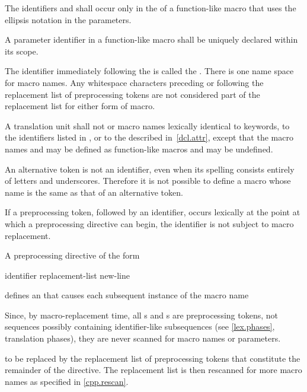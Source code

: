 \pnum
{}%
%
The identifiers  and 
shall occur only in the 
of a function-like macro that uses the ellipsis notation in the parameters.

\pnum
A parameter identifier in a function-like macro
shall be uniquely declared within its scope.

\pnum
The identifier immediately following the
is called the
%
.
There is one name space for macro names.
Any whitespace characters preceding or following the
replacement list of preprocessing tokens are not considered
part of the replacement list for either form of macro.

\pnum
{}%
A translation unit shall not  or 
macro names lexically identical
to keywords,
to the identifiers listed in , or
to the  described in~\ref{dcl.attr},
except that the macro names  and  may be
defined as function-like macros and may be undefined.
\begin{note}
An alternative token is not an identifier,
even when its spelling consists entirely of letters and underscores.
Therefore it is not possible to define a macro
whose name is the same as that of an alternative token.
\end{note}

\pnum
If a
\tcode{\#}
preprocessing token,
followed by an identifier,
occurs lexically
at the point at which a preprocessing directive can begin,
the identifier is not subject to macro replacement.

\pnum
A preprocessing directive of the form
\begin{ncsimplebnf}
 identifier replacement-list new-line
%
\end{ncsimplebnf}
defines an
 that
causes each subsequent instance of the macro name
\begin{footnote}
Since, by macro-replacement time,
all s and s are preprocessing tokens,
not sequences possibly containing identifier-like subsequences
(see \ref{lex.phases}, translation phases),
they are never scanned for macro names or parameters.
\end{footnote}
to be replaced by the replacement list of preprocessing tokens
that constitute the remainder of the directive.
The replacement list is then rescanned for more macro names as
specified in \ref{cpp.rescan}.

